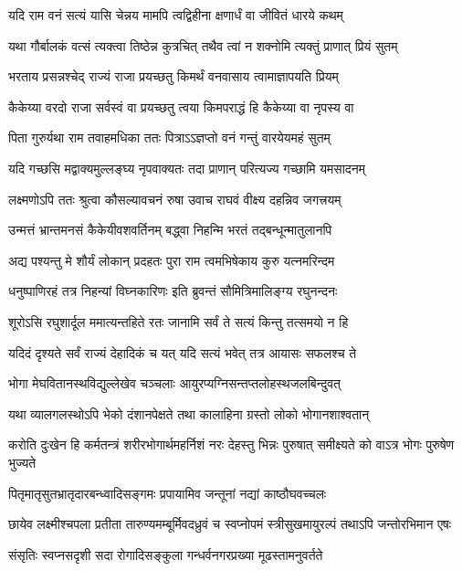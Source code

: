 \twolineshloka
{यदि राम वनं सत्यं यासि चेन्नय मामपि}
{त्वद्विहीना क्षणार्धं वा जीवितं धारये कथम्} %

\twolineshloka
{यथा गौर्बालकं वत्सं त्यक्त्वा तिष्ठेन्न कुत्रचित्}
{तथैव त्वां न शक्नोमि त्यक्तुं प्राणात् प्रियं सुतम्} %

\twolineshloka
{भरताय प्रसन्नश्चेद् राज्यं राजा प्रयच्छतु}
{किमर्थं वनवासाय त्वामाज्ञापयति प्रियम्} %

\twolineshloka
{कैकेय्या वरदो राजा सर्वस्वं वा प्रयच्छतु}
{त्वया किमपराद्धं हि कैकेय्या वा नृपस्य वा} %

\twolineshloka
{पिता गुरुर्यथा राम तवाहमधिका ततः}
{पित्राऽऽज्ञप्तो वनं गन्तुं वारयेयमहं सुतम्} %

\twolineshloka
{यदि गच्छसि मद्वाक्यमुल्लङ्घ्य नृपवाक्यतः}
{तदा प्राणान् परित्यज्य गच्छामि यमसादनम्} %

\twolineshloka
{लक्ष्मणोऽपि ततः श्रुत्वा कौसल्यावचनं रुषा}
{उवाच राघवं वीक्ष्य दहन्निव जगत्त्रयम्} %

\twolineshloka
{उन्मत्तं भ्रान्तमनसं कैकेयीवशवर्तिनम्}
{बद्\mbox{}ध्वा निहन्मि भरतं तद्बन्धून्मातुलानपि} %

\twolineshloka
{अद्य पश्यन्तु मे शौर्यं लोकान् प्रदहतः पुरा}
{राम त्वमभिषेकाय कुरु यत्नमरिन्दम} %

\twolineshloka
{धनुष्पाणिरहं तत्र निहन्यां विघ्नकारिणः}
{इति ब्रुवन्तं सौमित्रिमालिङ्ग्य रघुनन्दनः} %

\twolineshloka
{शूरोऽसि रघुशार्दूल ममात्यन्तहिते रतः}
{जानामि सर्वं ते सत्यं किन्तु तत्समयो न हि} %

\twolineshloka
{यदिदं दृश्यते सर्वं राज्यं देहादिकं च यत्}
{यदि सत्यं भवेत् तत्र आयासः सफलश्च ते} %

\twolineshloka
{भोगा मेघवितानस्थविद्युल्लेखेव चञ्चलाः}
{आयुरप्यग्निसन्तप्तलोहस्थजलबिन्दुवत्} %

\twolineshloka
{यथा व्यालगलस्थोऽपि भेको दंशानपेक्षते}
{तथा कालाहिना ग्रस्तो लोको भोगानशाश्वतान्} %

\fourlineindentedshloka
{करोति दुःखेन हि कर्मतन्त्रं}
{शरीरभोगार्थमहर्निशं नरः}
{देहस्तु भिन्नः पुरुषात् समीक्ष्यते}
{को वाऽत्र भोगः पुरुषेण भुज्यते} %

\twolineshloka
{पितृमातृसुतभ्रातृदारबन्ध्वादिसङ्गमः}
{प्रपायामिव जन्तूनां नद्यां काष्ठौघवच्चलः} %

\fourlineindentedshloka
{छायेव लक्ष्मीश्चपला प्रतीता}
{तारुण्यमम्बूर्मिवदध्रुवं च}
{स्वप्नोपमं स्त्रीसुखमायुरल्पं}
{तथाऽपि जन्तोरभिमान एषः} %

\twolineshloka
{संसृतिः स्वप्नसदृशी सदा रोगादिसङ्कुला}
{गन्धर्वनगरप्रख्या मूढस्तामनुवर्तते} %

